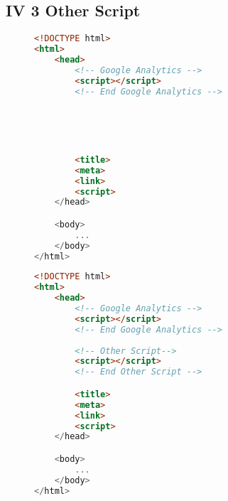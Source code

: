 \subsection{IV 3 Other Script}

\begin{sidewaysfigure}
\begin{multicols}{2}
\begin{center}
\begin{lstlisting}[caption={Other Script no}, language=html, numbers=none]
<!DOCTYPE html>
<html>
    <head>
        <!-- Google Analytics -->
        <script></script>
        <!-- End Google Analytics -->
        




        <title>
        <meta>
        <link>
        <script>
    </head>

    <body>
        ...
    </body>
</html>
\end{lstlisting}
\end{center}

\columnbreak

\begin{center}
\begin{lstlisting}[caption={Other Script yes}, language=html, numbers=none]
<!DOCTYPE html>
<html>
    <head>
        <!-- Google Analytics -->
        <script></script>
        <!-- End Google Analytics -->
        
        <!-- Other Script-->
        <script></script>
        <!-- End Other Script -->

        <title>
        <meta>
        <link>
        <script>
    </head>

    <body>
        ...
    </body>
</html>
\end{lstlisting}
\end{center}
\end{multicols}
\end{sidewaysfigure}













